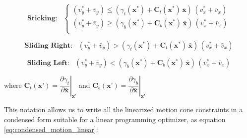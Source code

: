 \documentclass[12,twoside]{TFG-GM}
\theoremstyle{definition}
\theoremstyle{remark}
\newcommand*\diff[1]{\bar{#1}}
\begin{document}
\begin{equation} \label{eq:sticking_cone_linear}
\textbf{Sticking:}\,\,\,\,\, 
			\begin{cases}
              (v_y^* + \diff{v}_y) \leq (\gamma_t(\textbf{x}^*) + \textbf{C}_t(\textbf{x}^*)\, \diff{\textbf{x}})\,(v_x^* + \diff{v}_x)\\
              (v_y^* + \diff{v}_y) \geq (\gamma_b(\textbf{x}^*) + \textbf{C}_b(\textbf{x}^*)\, \diff{\textbf{x}})\,(v_x^* + \diff{v}_x)\\
            \end{cases}
\end{equation}

\begin{equation}\label{eq:right_cone_linear}
\textbf{Sliding Right:}\,\,\,\,\, (v_y^* + \diff{v}_y) > (\gamma_t(\textbf{x}^*) + \textbf{C}_t(\textbf{x}^*)\, \diff{\textbf{x}})\,(v_x^* + \diff{v}_x)            
\end{equation}

\begin{equation}\label{eq:left_cone_linear}
\textbf{Sliding Left:}\,\,\,\,\, (v_y^* + \diff{v}_y) < (\gamma_b(\textbf{x}^*) + \textbf{C}_b(\textbf{x}^*)\, \diff{\textbf{x}})\,(v_x^* + \diff{v}_x)
\end{equation}

where $\textbf{C}_t(\textbf{x'}) = \left.\dfrac{\partial \gamma_t}{\partial \diff{\textbf{x}}}\right|_{\textbf{x'}}$ and $\textbf{C}_b(\textbf{x'}) = \left.\dfrac{\partial \gamma_b}{\partial \diff{\textbf{x}}}\right|_{\textbf{x'}}$


This notation allows us to write all the linearized motion cone constraints in a condensed form suitable for a linear programming optimizer, as equation \ref{eq:condensed_motion_linear}:
\end{document}

